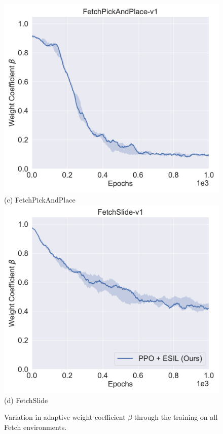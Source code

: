 \begin{figure}[H]
  \includegraphics[width=\linewidth]{figures/chapter3/pick_samples.pdf}
  ({c}) FetchPickAndPlace
\endminipage
{}%
  \centering
  \includegraphics[width=\linewidth]{figures/chapter3/slide_samples.pdf}
  ({d}) FetchSlide
\endminipage\hfill
\caption{Variation in adaptive weight coefficient $\beta$ through the training on all Fetch environments.}
\label{fig:her_samples_compare}
\end{figure}
